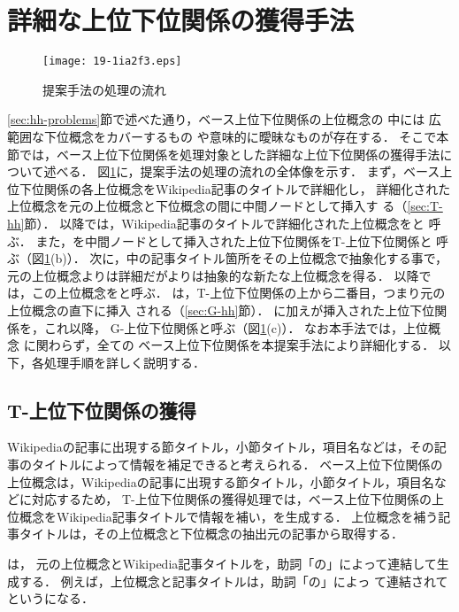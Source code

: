 \documentclass[japanese]{jnlp_1.4}
\newcommand{\thype}{}
\newcommand{\ghype}{}
\newcommand{\xmp}[1]{}
\begin{document}
\section{詳細な上位下位関係の獲得手法
\label{sec:proposed-method}}

\begin{figure}[b]
\begin{center}
\texttt{[image: 19-1ia2f3.eps]}
\end{center}
\caption{提案手法の処理の流れ}
\label{fig:whole-procedure}
\end{figure}

\ref{sec:hh-problems}節で述べた通り，ベース上位下位関係の上位概念の
中には
広範囲な下位概念をカバーするもの
や意味的に曖昧なものが存在する．
そこで本節では，ベース上位下位関係を処理対象とした詳細な上位下位関係の獲得手法について述べる．
図\ref{fig:whole-procedure}に，提案手法の処理の流れの全体像を示す．
まず，ベース上位下位関係の各上位概念をWikipedia記事のタイトルで詳細化し，
詳細化された上位概念を元の上位概念と下位概念の間に中間ノードとして挿入す
る（\ref{sec:T-hh}節）．
以降では，Wikipedia記事のタイトルで詳細化された上位概念を\thype{}と
呼ぶ．
また，\thype{}を中間ノードとして挿入された上位下位関係をT-上位下位関係と
呼ぶ（図\ref{fig:whole-procedure}(b)）．
次に，\thype{}中の記事タイトル箇所をその上位概念で抽象化する事で，
元の上位概念よりは詳細だが\thype{}よりは抽象的な新たな上位概念を得る．
以降では，この上位概念を\ghype{}と呼ぶ．
\ghype{}は，T-上位下位関係の上から二番目，つまり元の上位概念の直下に挿入
される（\ref{sec:G-hh}節）．
\thype{}に加え\ghype{}が挿入された上位下位関係を，これ以降，
G-上位下位関係と呼ぶ（図\ref{fig:whole-procedure}(c)）．
なお本手法では，上位概念
に関わらず，全ての
ベース上位下位関係を本提案手法により詳細化する．
以下，各処理手順を詳しく説明する．


\subsection{T-上位下位関係の獲得
\label{sec:T-hh}}

Wikipediaの記事に出現する節タイトル，小節タイトル，項目名などは，その記事のタイトルによって情報を補足できると考えられる．
ベース上位下位関係の上位概念は，Wikipediaの記事に出現する節タイトル，小節タイトル，項目名などに対応するため，
T-上位下位関係の獲得処理では，ベース上位下位関係の上位概念をWikipedia記事タイトルで情報を補い，\thype{}を生成する．
上位概念を補う記事タイトルは，その上位概念と下位概念の抽出元の記事から取得する．


\thype{}は，
元の上位概念とWikipedia記事タイトルを，助詞「の」によって連結して生成する．
例えば，上位概念\xmp{作品}と記事タイトル\xmp{黒澤明}は，助詞「の」によっ
て連結されて\xmp{黒澤明の作品}という\thype{}になる．
\end{document}
